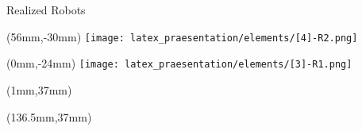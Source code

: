 \documentclass[11pt,aspectratio=169]{beamer}
\begin{document}
\begin{frame}[fragile]{Realized Robots}

        \begin{textblock*}{5cm}(56mm,-30mm) %
        \texttt{[image: latex\_praesentation/elements/[4]-R2.png]}
        \end{textblock*}
    
        \begin{textblock*}{8cm}(0mm,-24mm) %
        \texttt{[image: latex\_praesentation/elements/[3]-R1.png]}
        \end{textblock*}

        \begin{textblock*}{5cm}(1mm,37mm) %
        {\color{white} \tiny \cite{Guan}}
        \end{textblock*}

        \begin{textblock*}{5cm}(136.5mm,37mm) %
        {\color{white} \tiny \cite{extended}}
        \end{textblock*}
 
\end{frame}
\end{document}
